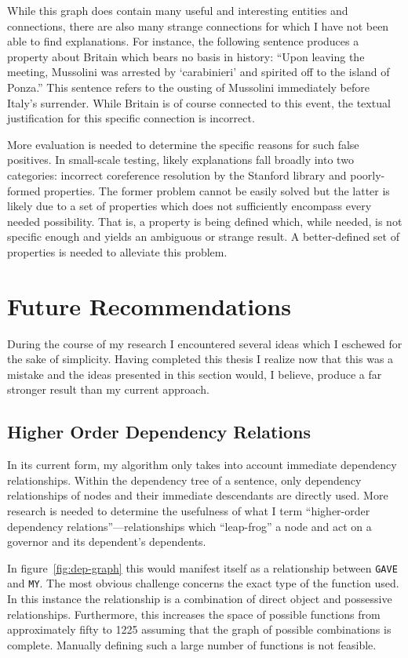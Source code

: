 While this graph does contain many useful and interesting entities and connections, there are also many strange connections for which I have not been able to find explanations.  For instance, the following sentence produces a property about Britain which bears no basis in history: ``Upon leaving the meeting, Mussolini was arrested by `carabinieri' and spirited off to the island of Ponza.''  This sentence refers to the ousting of Mussolini immediately before Italy's surrender.  While Britain is of course connected to this event, the textual justification for this specific connection is incorrect.  

More evaluation is needed to determine the specific reasons for such false positives.  In small-scale testing, likely explanations fall broadly into two categories: incorrect coreference resolution by the Stanford library and poorly-formed properties.  The former problem cannot be easily solved but the latter is likely due to a set of properties which does not sufficiently encompass every needed possibility.  That is, a property is being defined which, while needed, is not specific enough and yields an ambiguous or strange result.  A better-defined set of properties is needed to alleviate this problem.


\chapter{Future Recommendations} 
\label{chp:recs}
During the course of my research I encountered several ideas which I eschewed for the sake of simplicity.  Having completed this thesis I realize now that this was a mistake and the ideas presented in this section would, I believe, produce a far stronger result than my current approach.

\section{Higher Order Dependency Relations}

In its current form, my algorithm only takes into account immediate dependency relationships.  Within the dependency tree of a sentence, only dependency relationships of nodes and their immediate descendants are directly used.  More research is needed to determine the usefulness of what I term ``higher-order dependency relations''---relationships which ``leap-frog'' a node and act on a governor and its dependent's dependents.

In figure~\ref{fig:dep-graph} this would manifest itself as a relationship between \verb|GAVE| and \verb|MY|.  The most obvious challenge concerns the exact type of the function used.  In this instance the relationship is a combination of direct object and possessive relationships.  Furthermore, this increases the space of possible functions from approximately fifty to 1225 assuming that the graph of possible combinations is complete.  Manually defining such a large number of functions is not feasible.  

